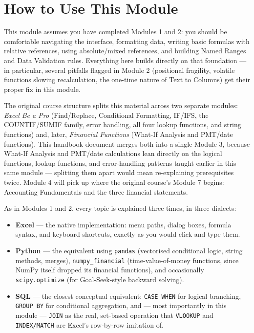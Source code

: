 \documentclass[11pt,a4paper]{article}
\begin{document}
\hypersetup{pageanchor=true}
\tableofcontents
\clearpage
{}

\section{How to Use This Module}

This module assumes you have completed Modules 1 and 2: you should be comfortable navigating the interface, formatting data, writing basic formulas with relative references, using absolute/mixed references, and building Named Ranges and Data Validation rules. Everything here builds directly on that foundation --- in particular, several pitfalls flagged in Module 2 (positional fragility, volatile functions slowing recalculation, the one-time nature of Text to Columns) get their proper fix in this module.

\begin{pitfall}
The original course structure splits this material across two separate modules: \textit{Excel Be a Pro} (Find/Replace, Conditional Formatting, IF/IFS, the COUNTIF/SUMIF family, error handling, all four lookup functions, and string functions) and, later, \textit{Financial Functions} (What-If Analysis and PMT/date functions). This handbook document merges both into a single Module 3, because What-If Analysis and PMT/date calculations lean directly on the logical functions, lookup functions, and error-handling patterns taught earlier in this same module --- splitting them apart would mean re-explaining prerequisites twice. Module 4 will pick up where the original course's Module 7 begins: Accounting Fundamentals and the three financial statements.
\end{pitfall}

As in Modules 1 and 2, every topic is explained three times, in three dialects:

\begin{itemize}
  \item \textbf{Excel} --- the native implementation: menu paths, dialog boxes, formula syntax, and keyboard shortcuts, exactly as you would click and type them.
  \item \textbf{Python} --- the equivalent using \texttt{pandas} (vectorised conditional logic, string methods, merges), \texttt{numpy\_financial} (time-value-of-money functions, since NumPy itself dropped its financial functions), and occasionally \texttt{scipy.optimize} (for Goal-Seek-style backward solving).
  \item \textbf{SQL} --- the closest conceptual equivalent: \texttt{CASE WHEN} for logical branching, \texttt{GROUP BY} for conditional aggregation, and --- most importantly in this module --- \texttt{JOIN} as the real, set-based operation that \texttt{VLOOKUP} and \texttt{INDEX/MATCH} are Excel's row-by-row imitation of.
\end{itemize}
\end{document}
